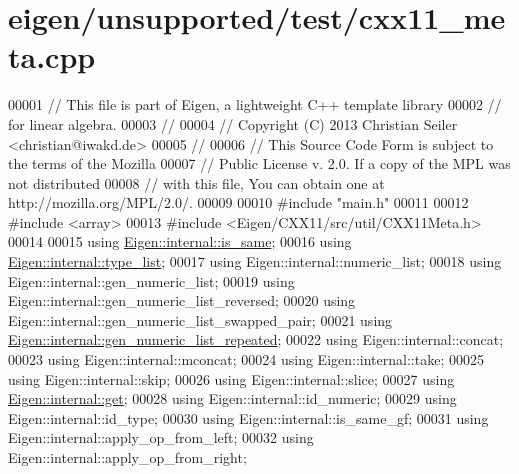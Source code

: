 \hypertarget{eigen_2unsupported_2test_2cxx11__meta_8cpp_source}{}\section{eigen/unsupported/test/cxx11\+\_\+meta.cpp}
\label{eigen_2unsupported_2test_2cxx11__meta_8cpp_source}

\begin{DoxyCode}
00001 \textcolor{comment}{// This file is part of Eigen, a lightweight C++ template library}
00002 \textcolor{comment}{// for linear algebra.}
00003 \textcolor{comment}{//}
00004 \textcolor{comment}{// Copyright (C) 2013 Christian Seiler <christian@iwakd.de>}
00005 \textcolor{comment}{//}
00006 \textcolor{comment}{// This Source Code Form is subject to the terms of the Mozilla}
00007 \textcolor{comment}{// Public License v. 2.0. If a copy of the MPL was not distributed}
00008 \textcolor{comment}{// with this file, You can obtain one at http://mozilla.org/MPL/2.0/.}
00009 
00010 \textcolor{preprocessor}{#include "main.h"}
00011 
00012 \textcolor{preprocessor}{#include <array>}
00013 \textcolor{preprocessor}{#include <Eigen/CXX11/src/util/CXX11Meta.h>}
00014 
00015 \textcolor{keyword}{using} \hyperlink{struct_eigen_1_1internal_1_1is__same}{Eigen::internal::is\_same};
00016 \textcolor{keyword}{using} \hyperlink{struct_eigen_1_1internal_1_1type__list}{Eigen::internal::type\_list};
00017 \textcolor{keyword}{using} Eigen::internal::numeric\_list;
00018 \textcolor{keyword}{using} Eigen::internal::gen\_numeric\_list;
00019 \textcolor{keyword}{using} Eigen::internal::gen\_numeric\_list\_reversed;
00020 \textcolor{keyword}{using} Eigen::internal::gen\_numeric\_list\_swapped\_pair;
00021 \textcolor{keyword}{using} \hyperlink{struct_eigen_1_1internal_1_1gen__numeric__list__repeated}{Eigen::internal::gen\_numeric\_list\_repeated};
00022 \textcolor{keyword}{using} Eigen::internal::concat;
00023 \textcolor{keyword}{using} Eigen::internal::mconcat;
00024 \textcolor{keyword}{using} Eigen::internal::take;
00025 \textcolor{keyword}{using} Eigen::internal::skip;
00026 \textcolor{keyword}{using} Eigen::internal::slice;
00027 \textcolor{keyword}{using} \hyperlink{struct_eigen_1_1internal_1_1get}{Eigen::internal::get};
00028 \textcolor{keyword}{using} Eigen::internal::id\_numeric;
00029 \textcolor{keyword}{using} Eigen::internal::id\_type;
00030 \textcolor{keyword}{using} Eigen::internal::is\_same\_gf;
00031 \textcolor{keyword}{using} Eigen::internal::apply\_op\_from\_left;
00032 \textcolor{keyword}{using} Eigen::internal::apply\_op\_from\_right;

\end{DoxyCode}
